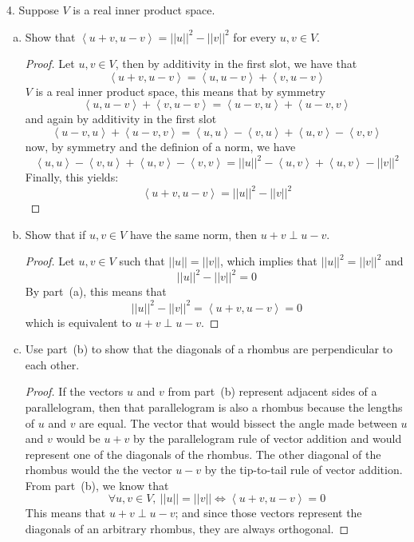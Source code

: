 \documentclass{article}
\newcommand{\be}{\begin{enumerate}}
\newcommand{\ee}{\end{enumerate}}
\newcommand{\norm}[1]{\left|\left|#1\right|\right|}
\newcommand{\abracks}[1]{\left< #1\right>}
\begin{document}
    \item[4.] Suppose $V$ is a real inner product space.
    \be[(a)] 
        \item Show that $\abracks{u+v, u-v} = \norm{u}^2 - \norm{v}^2$ for 
        every $u,v \in V$.
        \begin{proof}
        Let $u,v \in V$, then by additivity in the first slot, we have that 
        $$\abracks{u+v, u-v} = \abracks{u, u-v} + \abracks{v,u-v}$$
        $V$ is a real inner product space, this means that by symmetry
        $$\abracks{u, u-v} + \abracks{v,u-v}= 
        \abracks{u-v, u} + \abracks{u-v,v}$$
        and again by additivity in the first slot
        $$\abracks{u-v, u} + \abracks{u-v,v} = 
        \abracks{u, u} - \abracks{v,u}+\abracks{u, v} - \abracks{v,v}$$
        now, by symmetry and the definion of a norm, we have 
        $$\abracks{u, u} - \abracks{v,u}+\abracks{u, v} - \abracks{v,v}=
        \norm{u}^2 - \abracks{u,v}+\abracks{u,v} -\norm{v}^2$$
        Finally, this yields:
        $$\abracks{u+v, u-v} = \norm{u}^2 - \norm{v}^2$$

        \end{proof}

        \item Show that if $u,v \in V$ have the same norm, then 
        $u+v \perp u-v$.
        \begin{proof}
        Let $u,v\in V$ such that $\norm{u} = \norm{v}$, which implies that 
        $\norm{u}^2 = \norm{v}^2$ and 
        $$\norm{u}^2 - \norm{v}^2 = 0$$
        By part~(a), this means that 
        $$\norm{u}^2 - \norm{v}^2 = \abracks{u+v, u-v} = 0$$
        which is equivalent to $u+v \perp u-v$.
        \end{proof}

        \item Use part~(b) to show that the diagonals of a rhombus are 
        perpendicular to each other.
        \begin{proof}
        If the vectors $u$ and $v$ from part~(b) represent adjacent sides 
        of a parallelogram, then that 
        parallelogram is also a rhombus because the lengths of $u$ and $v$ 
        are equal. The vector that would bissect the angle made between $u$
        and $v$ would be $u + v$ by the parallelogram rule of vector 
        addition and would represent one of the diagonals of 
        the rhombus. The other diagonal of the rhombus would the the vector
        $u - v$ by the tip-to-tail rule of vector addition. From part~(b),
        we know that 
        $$\forall u,v \in V,\ \norm{u} = \norm{v} \iff \abracks{u+v,u-v} = 
        0$$ 
        This means that $u+v\perp u-v$; and since those vectors represent 
        the diagonals of an arbitrary rhombus, they are always orthogonal.
        \end{proof}
    \ee
    
\end{document}
